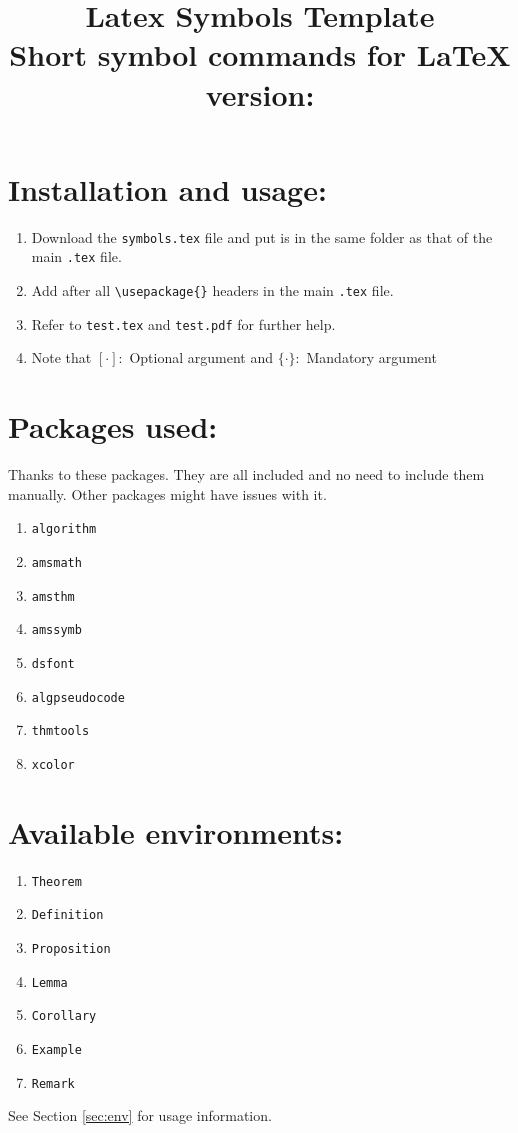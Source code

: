 \documentclass{article}
\title{\Huge{\textbf{Latex Symbols Template}} \\\vspace{10pt} \Large{Short symbol commands for \LaTeX} \\ \vspace{10pt} version: \Version \vspace{20pt}}
\author{\Author}
\date{\Update}
\begin{document}
	\maketitle\newpage
	\tableofcontents
	
	\newpage
	\section{Installation and usage:}
	\begin{enumerate}
		\item Download the \texttt{symbols.tex} file and put is in the same folder as that of the main \texttt{.tex} file.
		\item Add \verb|| after all \verb|\usepackage{}| headers in the main \texttt{.tex} file.
		\item Refer to \texttt{test.tex} and \texttt{test.pdf} for further help.
		\item Note that $[\cdot]:$ Optional argument and $\{\cdot\}:$ Mandatory argument
	\end{enumerate}
	
	\section{Packages used:}
	Thanks to these packages. They are all included and no need to include them manually. Other packages might have issues with it.
	\begin{enumerate}
		\item \texttt{algorithm}
		\item \texttt{amsmath}
		\item \texttt{amsthm}
		\item \texttt{amssymb}
		\item \texttt{dsfont}
		\item \texttt{algpseudocode}
		\item \texttt{thmtools}
		\item \texttt{xcolor}
	\end{enumerate}
	
	\section{Available environments:}
	\begin{enumerate}
		\item \texttt{Theorem}
		\item \texttt{Definition}
		\item \texttt{Proposition}
		\item \texttt{Lemma}
		\item \texttt{Corollary}
		\item \texttt{Example}
		\item \texttt{Remark}
	\end{enumerate}
	See Section \ref{sec:env} for usage information.
	
\end{document}
